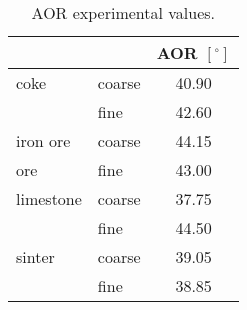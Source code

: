 \begin{table}%
\centering
\begin{tabular}{ll|c}
\hline
          &       & AOR $[^\circ]$ \\
\hline
    coke  & coarse & 40.90 \\
      & fine  & 42.60 \\
\hline      
    iron ore & coarse & 44.15 \\
     ore & fine  & 43.00 \\
\hline     
    limestone & coarse & 37.75 \\
     & fine  & 44.50 \\
\hline     
    sinter & coarse & 39.05 \\
     & fine  & 38.85 \\
             \hline
\end{tabular}
\caption{AOR experimental values.}
\label{tab:23aor}
\end{table}